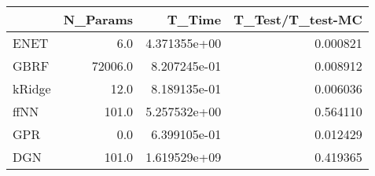 \begin{tabular}{lrrr}
\toprule
{} &  N\_Params &        T\_Time &  T\_Test/T\_test-MC \\
\midrule
ENET   &       6.0 &  4.371355e+00 &          0.000821 \\
GBRF   &   72006.0 &  8.207245e-01 &          0.008912 \\
kRidge &      12.0 &  8.189135e-01 &          0.006036 \\
ffNN   &     101.0 &  5.257532e+00 &          0.564110 \\
GPR    &       0.0 &  6.399105e-01 &          0.012429 \\
DGN    &     101.0 &  1.619529e+09 &          0.419365 \\
\bottomrule
\end{tabular}
